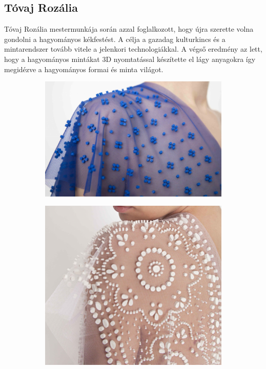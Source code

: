 \documentclass[fontsize=12pt, appendixprefix=true]{scrreprt}
\begin{document}
\subsection{Tóvaj Rozália}
Tóvaj Rozália mestermunkája \cite{tovaj2018} során azzal foglalkozott, hogy újra szerette volna gondolni a hagyományos kékfestést. A célja a gazadag kulturkincs és a mintarendszer tovább vitele a jelenkori technologiákkal. A végső eredmény az lett, hogy a hagyományos mintákat 3D nyomtatással készítette el lágy anyagokra így megidézve a hagyományos formai és minta világot.

\begin{figure}[hb!]
	\centering
	\begin{subfigure}[b]{0.3\linewidth}
	  \includegraphics[width=\linewidth]{img/tr_01.png}
	  \caption{}
	\end{subfigure}
	\begin{subfigure}[b]{0.3\linewidth}
	  \includegraphics[width=\linewidth]{img/tr_02.png}

\end{subfigure}
\end{figure}
\end{document}
